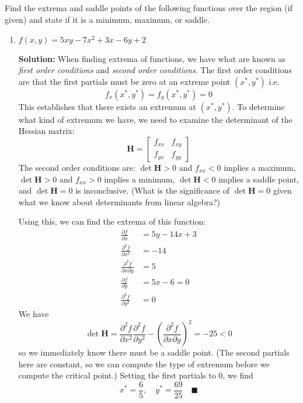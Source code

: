 \documentclass[letterpaper, 11pt]{article}
\begin{document}
\subsection{} Find the extrema and saddle points of the following functions over the region (if given) and state if it is a minimum, maximum, or saddle. 
\begin{enumerate}[label=(\alph*)]
\item $f(x,y) = 5xy - 7x^2+3x - 6y +2$
\par \textbf{Solution:} When finding extrema of functions, we have what are known as \textit{first order conditions} and \textit{second order conditions}. The first order conditions are that the first partials must be zero at an extreme point $(x^*, y^*)$ i.e.
\[ f_x(x^*,y^*) = f_y(x^*,y^*) = 0 \]
This establishes that there exists an extremum at $(x^*,y^*)$. To determine what kind of extremum we have, we need to examine the determinant of the Hessian matrix:
\[ \bm{H} = \left[ \begin{array}{cc} f_{xx} & f_{xy} \\f_{yx} & f_{yy} \end{array} \right] \]
The second order conditions are: $\det \bm{H} > 0$ and $ f_{xx} < 0$ implies a maximum, $\det \bm{H} > 0$ and $ f_{xx} > 0$ implies a minimum, $\det \bm{H}< 0 $ implies a saddle point, and $\det \bm{H} = 0$ is inconclusive. (What is the significance of $\det \bm{H} = 0$ given what we know about determinants from linear algebra?)
\par Using this, we can find the extrema of this function:
\begin{align*}
\frac{\partial f}{\partial x} &= 5y - 14x + 3\\
\frac{\partial^2 f}{\partial x^2} &= -14\\
\frac{\partial^2 f}{\partial x\partial y} &= 5\\
\frac{\partial f}{\partial y} &= 5x - 6 = 0 \\
\frac{\partial^2 f}{\partial y^2} &=0
\end{align*}
We have
\[ \det \bm{H} = \frac{\partial^2 f}{\partial x^2}\frac{\partial^2 f}{\partial y^2}- \left(\frac{\partial^2 f}{\partial x\partial y}\right)^2 = -25 < 0 \]
so we immediately know there must be a saddle point. (The second partials here are constant, so we can compute the type of extremum before we compute the critical point.) Setting the first partials to 0, we find
\[ x^* = \frac{6}{5}, \quad y^* = \frac{69}{25}  \quad\blacksquare \]


\end{enumerate}
\end{document}
